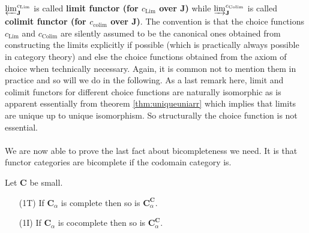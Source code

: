 $\varprojlim_{\mathbf{J}}^{c_{\mathrm{Lim}}}$ is called \textbf{limit functor (for $c_{\mathrm{Lim}}$ over $\mathbf{J}$)} while $\varinjlim_{\mathbf{J}}^{c_{\mathrm{Colim}}}$ is called \textbf{colimit functor (for $c_{\mathrm{colim}}$ over $\mathbf{J}$)}. The convention is that the choice functions $c_{\mathrm{Lim}}$ and $c_{\mathrm{Colim}}$ are silently assumed to be the canonical ones obtained from constructing the limits explicitly if possible (which is practically always possible in category theory) and else the choice functions obtained from the axiom of choice when technically necessary. Again, it is common not to mention them in practice and so will we do in the following. As a last remark here, limit and colimit functors for different choice functions are naturally isomorphic as is apparent essentially from theorem \ref{thm:uniqueuniarr} which implies that limits are unique up to unique isomorphism. So structurally the choice function is not essential.
\\\\
We are now able to prove the last fact about bicompleteness we need. It is that functor categories are bicomplete if the codomain category is.
\\
\begin{thm}
\label{thm:funccatbicomplete}
Let $\mathbf{C}$ be small.
\begin{enumerate}
\item[(1T)]
If $\mathbf{C}_{\alpha}$ is complete then so is $\mathbf{C}_{\alpha}^{\mathbf{C}}$.
\item[(1I)]
If $\mathbf{C}_{\alpha}$ is cocomplete then so is $\mathbf{C}_{\alpha}^{\mathbf{C}}$.
\end{enumerate}
\end{thm}
